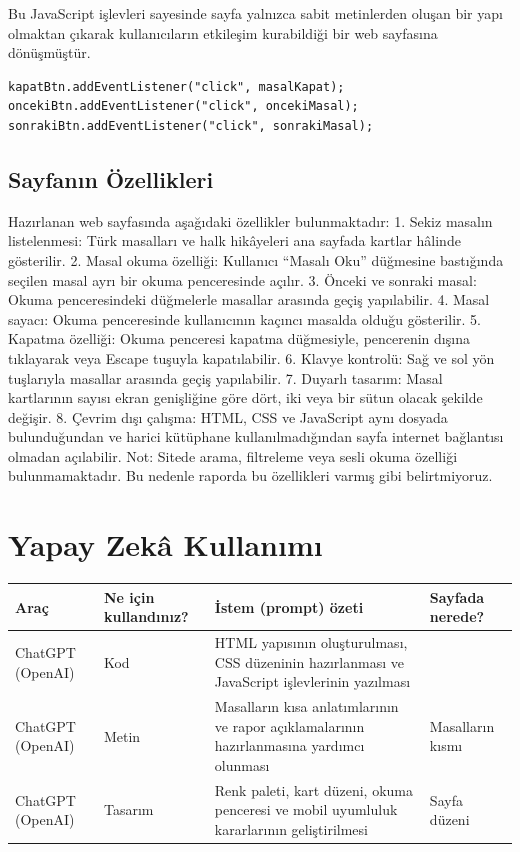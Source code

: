 \documentclass[12pt,a4paper]{article}
\begin{document}
Bu JavaScript işlevleri sayesinde sayfa yalnızca sabit metinlerden oluşan bir yapı olmaktan çıkarak kullanıcıların etkileşim kurabildiği bir web sayfasına dönüşmüştür.
\begin{lstlisting}[caption={İçsel JavaScript'ten önemli bir bölüm}]
kapatBtn.addEventListener("click", masalKapat);
oncekiBtn.addEventListener("click", oncekiMasal);
sonrakiBtn.addEventListener("click", sonrakiMasal);
\end{lstlisting}

\subsection{Sayfanın Özellikleri}

Hazırlanan web sayfasında aşağıdaki özellikler bulunmaktadır:
1. Sekiz masalın listelenmesi: Türk masalları ve halk hikâyeleri ana sayfada kartlar hâlinde gösterilir.
2. Masal okuma özelliği: Kullanıcı “Masalı Oku” düğmesine bastığında seçilen masal ayrı bir okuma penceresinde açılır.
3. Önceki ve sonraki masal: Okuma penceresindeki düğmelerle masallar arasında geçiş yapılabilir.
4. Masal sayacı: Okuma penceresinde kullanıcının kaçıncı masalda olduğu gösterilir.
5. Kapatma özelliği: Okuma penceresi kapatma düğmesiyle, pencerenin dışına tıklayarak veya Escape tuşuyla kapatılabilir.
6. Klavye kontrolü: Sağ ve sol yön tuşlarıyla masallar arasında geçiş yapılabilir.
7. Duyarlı tasarım: Masal kartlarının sayısı ekran genişliğine göre dört, iki veya bir sütun olacak şekilde değişir.
8. Çevrim dışı çalışma: HTML, CSS ve JavaScript aynı dosyada bulunduğundan ve harici kütüphane kullanılmadığından sayfa internet bağlantısı olmadan açılabilir.
Not: Sitede arama, filtreleme veya sesli okuma özelliği bulunmamaktadır. Bu nedenle raporda bu özellikleri varmış gibi belirtmiyoruz.


\section{Yapay Zekâ Kullanımı}

\begin{longtable}{@{}p{2.6cm}p{3.6cm}p{4.2cm}p{3.4cm}@{}}
\toprule
\textbf{Araç} & \textbf{Ne için kullandınız?} & \textbf{İstem (prompt) özeti} & \textbf{Sayfada nerede?} \\
\midrule
\endhead
\relax ChatGPT (OpenAI) & Kod & HTML yapısının oluşturulması, CSS düzeninin hazırlanması ve JavaScript işlevlerinin yazılması &  \\
\relax ChatGPT (OpenAI) & Metin & Masalların kısa anlatımlarının ve rapor açıklamalarının hazırlanmasına yardımcı olunması & Masalların kısmı \\
\relax ChatGPT (OpenAI) & Tasarım & Renk paleti, kart düzeni, okuma penceresi ve mobil uyumluluk kararlarının geliştirilmesi & Sayfa düzeni \\
\bottomrule
\end{longtable}
\end{document}
